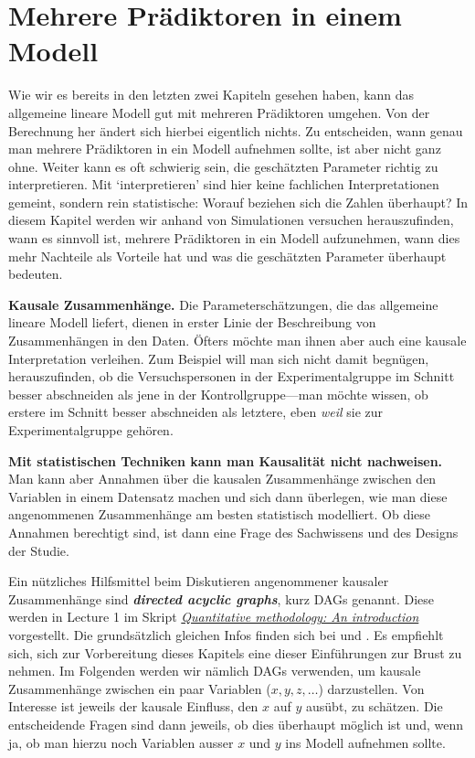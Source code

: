\chapter{Mehrere Prädiktoren in einem Modell}\label{ch:multimod}
Wie wir es bereits in den letzten zwei Kapiteln
gesehen haben, kann das allgemeine lineare Modell
gut mit mehreren Prädiktoren umgehen. Von der
Berechnung her ändert sich hierbei eigentlich nichts.
Zu entscheiden, wann genau man mehrere Prädiktoren
in ein Modell aufnehmen sollte, ist aber nicht ganz ohne.
Weiter kann es oft schwierig sein, die geschätzten
Parameter richtig zu interpretieren.
Mit `interpretieren' sind hier keine fachlichen Interpretationen gemeint,
sondern rein statistische: Worauf beziehen sich die Zahlen
überhaupt?
In diesem Kapitel werden wir anhand von Simulationen
versuchen herauszufinden, wann es sinnvoll ist, mehrere
Prädiktoren in ein Modell aufzunehmen, wann dies mehr Nachteile
als Vorteile hat und was die geschätzten Parameter
überhaupt bedeuten.

\medskip

\begin{framed}
\textbf{Kausale Zusammenhänge.}
Die Parameterschätzungen, die das allgemeine lineare Modell liefert,
dienen in erster Linie der Beschreibung von Zusammenhängen in den Daten.
Öfters möchte man ihnen aber auch eine kausale Interpretation verleihen.
Zum Beispiel will man sich nicht damit begnügen, herauszufinden,
ob die Versuchspersonen in der Experimentalgruppe im Schnitt besser
abschneiden als jene in der Kontrollgruppe---man möchte wissen,
ob erstere im Schnitt besser abschneiden als letztere, eben \emph{weil}
sie zur Experimentalgruppe gehören.

{\bf Mit statistischen Techniken kann man Kausalität nicht nachweisen.}
Man kann aber Annahmen über die kausalen Zusammenhänge zwischen
den Variablen in einem Datensatz machen und sich dann überlegen,
wie man diese angenommenen Zusammenhänge am besten statistisch 
modelliert. Ob diese Annahmen berechtigt sind, ist dann 
eine Frage des Sachwissens und des Designs der Studie.
\end{framed}

\medskip

Ein nützliches Hilfsmittel beim Diskutieren angenommener
kausaler Zusammenhänge sind 
\textbf{\textit{directed acyclic graphs}},
kurz DAGs genannt. Diese werden in Lecture 1 im Skript
\href{https://janhove.github.io/teaching/2020/12/16/quant-meth}{\textit{Quantitative methodology: An introduction}} vorgestellt. Die grundsätzlich gleichen Infos 
finden sich bei \citet{Rohrer2018} und \citet{McElreath2020}. 
Es empfiehlt sich,
sich zur Vorbereitung dieses Kapitels eine dieser
Einführungen zur Brust zu nehmen.
Im Folgenden werden wir nämlich DAGs verwenden, um 
kausale Zusammenhänge zwischen ein paar Variablen
($x, y, z, \dots$) darzustellen. Von Interesse ist 
jeweils der kausale
Einfluss, den $x$ auf $y$ ausübt, zu schätzen. Die entscheidende
Fragen sind dann jeweils, ob dies überhaupt möglich ist und, wenn ja, ob
man hierzu noch Variablen ausser $x$ und $y$ ins Modell
aufnehmen sollte. 

